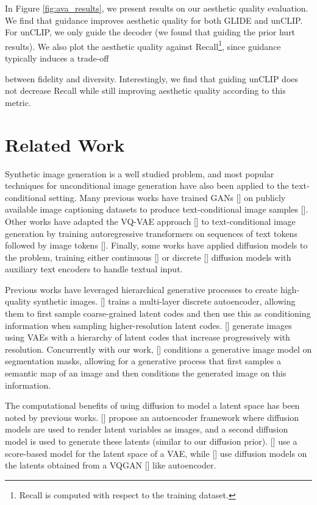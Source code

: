 In Figure \ref{fig:ava_results}, we present results on our aesthetic quality evaluation. We find that guidance improves aesthetic quality for both GLIDE and unCLIP. For unCLIP, we only guide the decoder (we found that guiding the prior hurt results). We also plot the aesthetic quality against Recall\footnote{Recall is computed with respect to the training dataset.}, since guidance typically induces a trade-off 

between fidelity and diversity. Interestingly, we find that guiding unCLIP does not decrease Recall while still improving aesthetic quality according to this metric.

\section{Related Work}

Synthetic image generation is a well studied problem, and most popular techniques for unconditional image generation have also been applied to the text-conditional setting. Many previous works have trained GANs [] on publicly available image captioning datasets to produce text-conditional image samples []. Other works have adapted the VQ-VAE approach [] to text-conditional image generation by training autoregressive transformers on sequences of text tokens followed by image tokens []. Finally, some works have applied diffusion models to the problem, training either continuous [] or discrete [] diffusion models with auxiliary text encoders to handle textual input.

Previous works have leveraged hierarchical generative processes to create high-quality synthetic images. \citeauthor{vqvae2} [] trains a multi-layer discrete autoencoder, allowing them to first sample coarse-grained latent codes and then use this as conditioning information when sampling higher-resolution latent codes. \citeauthor{vdvae,nvae} [] generate images using VAEs with a hierarchy of latent codes that increase progressively with resolution. Concurrently with our work, \citeauthor{makeascene} [] conditions a generative image model on segmentation masks, allowing for a generative process that first samples a semantic map of an image and then conditions the generated image on this information.

The computational benefits of using diffusion to model a latent space has been noted by previous works. \citeauthor{diffae} [] propose an autoencoder framework where diffusion models are used to render latent variables as images, and a second diffusion model is used to generate these latents (similar to our diffusion prior). \citeauthor{scorelatent} [] use a score-based model for the latent space of a VAE, while \citeauthor{latentdiffusion} [] use diffusion models on the latents obtained from a VQGAN [] like autoencoder.


